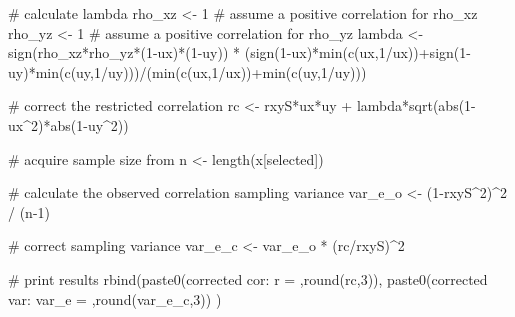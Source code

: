 \documentclass[
  letterpaper,
  DIV=11,
  numbers=noendperiod]{scrreprt}
\newenvironment{Shaded}{\begin{snugshade}}{\end{snugshade}}
\newcommand{\CommentTok}[1]{\textcolor[rgb]{0.37,0.37,0.37}{#1}}
\newcommand{\DecValTok}[1]{\textcolor[rgb]{0.68,0.00,0.00}{#1}}
\newcommand{\FunctionTok}[1]{\textcolor[rgb]{0.28,0.35,0.67}{#1}}
\newcommand{\NormalTok}[1]{\textcolor[rgb]{0.00,0.23,0.31}{#1}}
\newcommand{\OtherTok}[1]{\textcolor[rgb]{0.00,0.23,0.31}{#1}}
\newcommand{\SpecialCharTok}[1]{\textcolor[rgb]{0.37,0.37,0.37}{#1}}
\newcommand{\StringTok}[1]{\textcolor[rgb]{0.13,0.47,0.30}{#1}}
\begin{document}
\begin{Shaded}
\begin{Highlighting}[]
\CommentTok{\# calculate lambda}
\NormalTok{rho\_xz }\OtherTok{\textless{}{-}} \DecValTok{1} \CommentTok{\# assume a positive correlation for rho\_xz}
\NormalTok{rho\_yz }\OtherTok{\textless{}{-}} \DecValTok{1} \CommentTok{\# assume a positive correlation for rho\_yz}
\NormalTok{lambda }\OtherTok{\textless{}{-}} \FunctionTok{sign}\NormalTok{(rho\_xz}\SpecialCharTok{*}\NormalTok{rho\_yz}\SpecialCharTok{*}\NormalTok{(}\DecValTok{1}\SpecialCharTok{{-}}\NormalTok{ux)}\SpecialCharTok{*}\NormalTok{(}\DecValTok{1}\SpecialCharTok{{-}}\NormalTok{uy)) }\SpecialCharTok{*}\NormalTok{ (}\FunctionTok{sign}\NormalTok{(}\DecValTok{1}\SpecialCharTok{{-}}\NormalTok{ux)}\SpecialCharTok{*}\FunctionTok{min}\NormalTok{(}\FunctionTok{c}\NormalTok{(ux,}\DecValTok{1}\SpecialCharTok{/}\NormalTok{ux))}\SpecialCharTok{+}\FunctionTok{sign}\NormalTok{(}\DecValTok{1}\SpecialCharTok{{-}}\NormalTok{uy)}\SpecialCharTok{*}\FunctionTok{min}\NormalTok{(}\FunctionTok{c}\NormalTok{(uy,}\DecValTok{1}\SpecialCharTok{/}\NormalTok{uy)))}\SpecialCharTok{/}\NormalTok{(}\FunctionTok{min}\NormalTok{(}\FunctionTok{c}\NormalTok{(ux,}\DecValTok{1}\SpecialCharTok{/}\NormalTok{ux))}\SpecialCharTok{+}\FunctionTok{min}\NormalTok{(}\FunctionTok{c}\NormalTok{(uy,}\DecValTok{1}\SpecialCharTok{/}\NormalTok{uy)))}

\CommentTok{\# correct the restricted correlation}
\NormalTok{rc }\OtherTok{\textless{}{-}}\NormalTok{ rxyS}\SpecialCharTok{*}\NormalTok{ux}\SpecialCharTok{*}\NormalTok{uy }\SpecialCharTok{+}\NormalTok{ lambda}\SpecialCharTok{*}\FunctionTok{sqrt}\NormalTok{(}\FunctionTok{abs}\NormalTok{(}\DecValTok{1}\SpecialCharTok{{-}}\NormalTok{ux}\SpecialCharTok{\^{}}\DecValTok{2}\NormalTok{)}\SpecialCharTok{*}\FunctionTok{abs}\NormalTok{(}\DecValTok{1}\SpecialCharTok{{-}}\NormalTok{uy}\SpecialCharTok{\^{}}\DecValTok{2}\NormalTok{))}

\CommentTok{\# acquire sample size from }
\NormalTok{n }\OtherTok{\textless{}{-}} \FunctionTok{length}\NormalTok{(x[selected])}

\CommentTok{\# calculate the observed correlation sampling variance}
\NormalTok{var\_e\_o }\OtherTok{\textless{}{-}}\NormalTok{ (}\DecValTok{1}\SpecialCharTok{{-}}\NormalTok{rxyS}\SpecialCharTok{\^{}}\DecValTok{2}\NormalTok{)}\SpecialCharTok{\^{}}\DecValTok{2} \SpecialCharTok{/}\NormalTok{ (n}\DecValTok{{-}1}\NormalTok{)}

\CommentTok{\# correct sampling variance}
\NormalTok{var\_e\_c }\OtherTok{\textless{}{-}}\NormalTok{ var\_e\_o }\SpecialCharTok{*}\NormalTok{ (rc}\SpecialCharTok{/}\NormalTok{rxyS)}\SpecialCharTok{\^{}}\DecValTok{2}

\CommentTok{\# print results}
\FunctionTok{rbind}\NormalTok{(}\FunctionTok{paste0}\NormalTok{(}\StringTok{\textquotesingle{}corrected cor: r = \textquotesingle{}}\NormalTok{,}\FunctionTok{round}\NormalTok{(rc,}\DecValTok{3}\NormalTok{)),}
      \FunctionTok{paste0}\NormalTok{(}\StringTok{\textquotesingle{}corrected var: var\_e = \textquotesingle{}}\NormalTok{,}\FunctionTok{round}\NormalTok{(var\_e\_c,}\DecValTok{3}\NormalTok{))}
\NormalTok{      )}
\end{Highlighting}
\end{Shaded}
\end{document}
